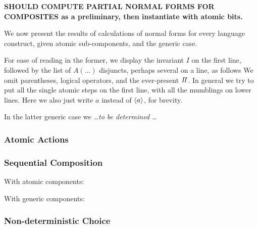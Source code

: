 \textbf{SHOULD COMPUTE PARTIAL NORMAL FORMS
FOR COMPOSITES as a preliminary, then instantiate with atomic bits.}

We now present the results of calculations of normal forms for every language
construct, given atomic sub-components,
and the generic case.

For ease of reading in the former,
we display the invariant $I$ on the first line,
followed by the list of $A(\dots)$ disjuncts, perhaps several on a line,
as follows
We omit parentheses, logical operators, and the ever-present $I\!I$.
In general we try to put all the single atomic steps on the first line,
with all the mumblings on lower lines.
Here we also just write $a$ instead of $\langle a\rangle$,
for brevity.

In the latter generic case we  \emph{\dots to be determined \dots}

\subsubsection{Atomic Actions}



\subsubsection{Sequential Composition}

With atomic components:

With generic components:


\subsubsection{Non-deterministic Choice}


